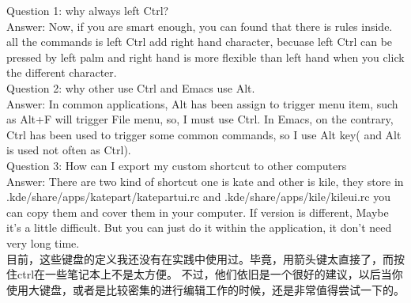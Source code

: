\documentclass[a4paper,12pt,twoside]{book}
\begin{document}
\begin{CJK*}{UTF8}{song}
\begin{itemize}
	Question 1: why always left Ctrl? \\
	Answer: Now, if you are smart enough, you can found that there is rules inside. all the commands is left Ctrl add right hand character, becuase left Ctrl can be
	pressed by left palm and right hand is more flexible than left hand when you click the different character. \\
	Question 2: why other use Ctrl and Emacs use Alt. \\
	Answer: In common applications, Alt has been assign to trigger menu item, such as Alt+F will trigger File menu, so, I must use Ctrl. In Emacs, on the contrary,
	Ctrl has been used to trigger some common commands, so I use Alt key( and Alt is used not often as Ctrl).\\
	Question 3: How can I export my custom shortcut to other computers \\
	Answer: There are two kind of shortcut one is kate and other is kile, they store in .kde/share/apps/katepart/katepartui.rc and \linebreak[4] .kde/share/apps/kile/kileui.rc
	you can copy them and cover them in your computer. If version is different, Maybe it's a little difficult. But you can just do it within the application, it
	don't need very long time. \\
	 目前，这些键盘的定义我还没有在实践中使用过。毕竟，用箭头键太直接了，而按住ctrl在一些笔记本上不是太方便。 不过，他们依旧是一个很好的建议，以后当你使用大键盘，或者是比较密集的进行编辑工作的时候，还是非常值得尝试一下的。 
	
	\end{itemize}

\end{CJK*}
\end{document}
